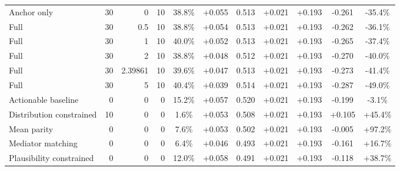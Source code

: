 \begin{table}[htbp]
\begin{tabular}{lrrrccccccc}
Anchor only & 30 & 0 & 10 & 38.8\% & +0.055 & 0.513 & +0.021 & +0.193 & -0.261 & -35.4\% \\
Full & 30 & 0.5 & 10 & 38.8\% & +0.054 & 0.513 & +0.021 & +0.193 & -0.262 & -36.1\% \\
Full & 30 & 1 & 10 & 40.0\% & +0.052 & 0.513 & +0.021 & +0.193 & -0.265 & -37.4\% \\
Full & 30 & 2 & 10 & 38.8\% & +0.048 & 0.512 & +0.021 & +0.193 & -0.270 & -40.0\% \\
Full & 30 & 2.39861 & 10 & 39.6\% & +0.047 & 0.513 & +0.021 & +0.193 & -0.273 & -41.4\% \\
Full & 30 & 5 & 10 & 40.4\% & +0.039 & 0.514 & +0.021 & +0.193 & -0.287 & -49.0\% \\
Actionable baseline & 0 & 0 & 0 & 15.2\% & +0.057 & 0.520 & +0.021 & +0.193 & -0.199 & -3.1\% \\
Distribution constrained & 10 & 0 & 0 & 1.6\% & +0.053 & 0.508 & +0.021 & +0.193 & +0.105 & +45.4\% \\
Mean parity & 0 & 0 & 0 & 7.6\% & +0.053 & 0.502 & +0.021 & +0.193 & -0.005 & +97.2\% \\
Mediator matching & 0 & 0 & 0 & 6.4\% & +0.046 & 0.493 & +0.021 & +0.193 & -0.161 & +16.7\% \\
Plausibility constrained & 0 & 0 & 0 & 12.0\% & +0.058 & 0.491 & +0.021 & +0.193 & -0.118 & +38.7\% \\
\bottomrule
\end{tabular}
\end{table}